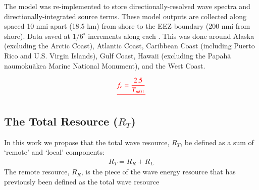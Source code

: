 The model was re-implemented \DIFdelbegin {}\DIFdelend to store directionally-resolved wave spectra and directionally-integrated source terms. These model outputs are collected along \DIFdelbegin {}\DIFdelend \DIFaddbegin {}\DIFaddend spaced 10 nmi apart (18.5 km) from shore to the EEZ boundary (200 nmi from shore). Data \DIFdelbegin {}\DIFdelend \DIFaddbegin {}\DIFaddend saved at $1/6^\circ$ increments along each \DIFdelbegin {}\DIFdelend \DIFaddbegin {}\DIFaddend . This was done around Alaska (excluding the Arctic Coast), Atlantic Coast, Caribbean Coast (including Puerto Rico and U.S. Virgin Islands), Gulf Coast, Hawaii (excluding the Papah$\bar{\text{a}}$naumoku$\bar{\text{a}}$kea Marine National Monument), and the West Coast. 

\DIFdelbegin {}%

\begin{eqnarray*}
    \DIFdel{f_{c} = \frac{2.5}{T_{m01}}
}\end{eqnarray*}%


\DIFdelend \subsection{The Total Resource ($R_T$) \label{sec:method:calc}}

In this work we propose that the total \DIFaddbegin {}\DIFaddend wave resource, $R_T$, be defined as a sum of `remote' and `local' components:
\begin{align}
  R_T = R_R + R_L
\end{align}
The remote resource, $R_R$, is the piece of the wave energy resource that has previously been defined as the total wave resource \DIFdelbegin {}\DIFdelend \DIFaddbegin {}\DIFaddend 

